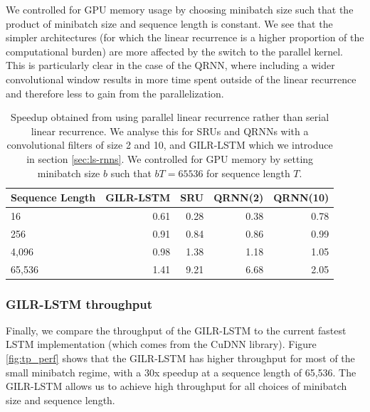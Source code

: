 \documentclass{article}
\begin{document}
We controlled for GPU memory usage by choosing minibatch size such that the product
of minibatch size and sequence length is constant. We see that the simpler architectures
(for which the linear recurrence is a higher proportion of the
computational burden) are more affected by the switch to the parallel kernel.  This is
particularly clear in the case of the QRNN, where including a wider
convolutional window results in more time spent outside of the linear recurrence and
therefore less to gain from the parallelization.
\begin{table}
\begin{center}
  \begin{tabular}{@{}lrrrr@{}}
    \label{table:rnn-throughput}
Sequence Length & GILR-LSTM & SRU & QRNN(2) & QRNN(10)\\ \midrule
16 & 0.61 & 0.28 & 0.38 & 0.78\\
256 & 0.91 & 0.84 & 0.86 & 0.99\\
4,096 & 0.98 & 1.38 & 1.18 & 1.05\\
65,536 & 1.41 & 9.21 & 6.68 & 2.05\\ \bottomrule
  \end{tabular}
\end{center}
\caption{
  Speedup obtained from using parallel linear recurrence rather than
  serial linear recurrence. We analyse this for
  SRUs \cite{lei2017} and QRNNs \cite{bradbury2017quasi} with a convolutional
  filters of size 2 and 10, and GILR-LSTM which we introduce in section \ref{sec:ls-rnns}.
  We controlled for GPU memory by setting minibatch size $b$ such that
  $bT = 65536$ for sequence length $T$.
}
\end{table}


\subsubsection{GILR-LSTM throughput}


Finally, we compare the throughput of the GILR-LSTM to the current fastest
LSTM implementation (which comes from the CuDNN library). Figure
\ref{fig:tp_perf} shows that the GILR-LSTM has higher throughput for most of the
small minibatch regime, with a 30x speedup at a sequence length of 65,536.
The GILR-LSTM allows us to achieve high throughput for all choices of minibatch size and
sequence length.
\end{document}
